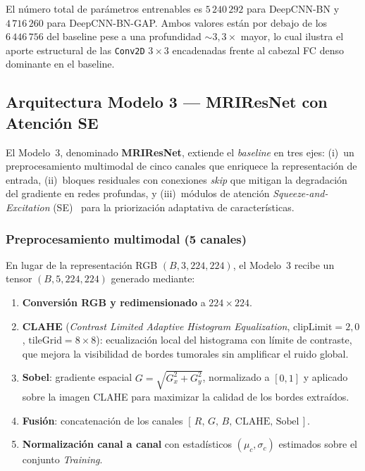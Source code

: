 El número total de parámetros entrenables es $5\,240\,292$
para DeepCNN-BN y $4\,716\,260$ para DeepCNN-BN-GAP. Ambos
valores están por debajo de los $6\,446\,756$ del baseline
pese a una profundidad $\sim 3{,}3\times$ mayor, lo cual ilustra
el aporte estructural de las \texttt{Conv2D} $3{\times}3$
encadenadas frente al cabezal FC denso dominante en el
baseline.

\subsection{Arquitectura Modelo 3 --- MRIResNet con Atención SE}
\label{sec:arq-m3}

El Modelo~3, denominado \textbf{MRIResNet}, extiende el
\textit{baseline} en tres ejes: (i)~un preprocesamiento multimodal
de cinco canales que enriquece la representación de entrada,
(ii)~bloques residuales con conexiones \textit{skip} que mitigan
la degradación del gradiente en redes profundas, y (iii)~módulos
de atención \textit{Squeeze-and-Excitation} (SE)~\cite{hu2018senet}
para la priorización adaptativa de características.

\subsubsection*{Preprocesamiento multimodal (5 canales)}

En lugar de la representación RGB $(B,3,224,224)$, el Modelo~3
recibe un tensor $(B,5,224,224)$ generado mediante:

\begin{enumerate}
  \item \textbf{Conversión RGB y redimensionado} a $224{\times}224$.
  \item \textbf{CLAHE} (\textit{Contrast Limited Adaptive Histogram
        Equalization}, $\text{clipLimit}{=}2{,}0$,
        $\text{tileGrid}{=}8{\times}8$): ecualización local del
        histograma con límite de contraste, que mejora la visibilidad
        de bordes tumorales sin amplificar el ruido global.
  \item \textbf{Sobel}: gradiente espacial
        $G {=} \sqrt{G_x^2{+}G_y^2}$, normalizado a $[0,1]$
        y aplicado sobre la imagen CLAHE para maximizar la calidad
        de los bordes extraídos.
  \item \textbf{Fusión}: concatenación de los canales
        $[\,R,\,G,\,B,\,\text{CLAHE},\,\text{Sobel}\,]$.
  \item \textbf{Normalización canal a canal} con estadísticos
        $(\mu_c, \sigma_c)$ estimados sobre el conjunto
        \textit{Training}.
\end{enumerate}

